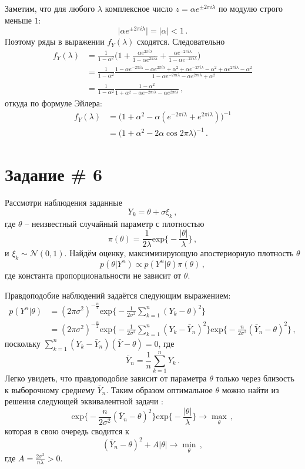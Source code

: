 \documentclass[a4paper]{article}
\begin{document}
Заметим, что для любого $\lambda$ комплексное число $z = \alpha e^{\pm 2\pi i \lambda}$
по модулю строго меньше $1$:
\[ \bigl\lvert \alpha e^{\pm 2\pi i \lambda}\bigr\rvert = |\alpha| < 1\,. \]
Поэтому ряды в выражении $f_Y(\lambda)$ сходятся. Следовательно
\begin{align*}
	f_Y(\lambda)
	&= \frac{1}{1-\alpha^2} \biggl( 1
		+ \frac{\alpha e^{2\pi i \lambda}}{1-\alpha e^{2\pi i \lambda}}
		+ \frac{\alpha e^{-2\pi i \lambda}}{1-\alpha e^{-2\pi i \lambda}}
		\biggr)\\
	&= \frac{1}{1-\alpha^2} \frac{
		1 - \alpha e^{-2\pi i \lambda} - \alpha e^{2\pi i \lambda } + \alpha^2
		+ \alpha e^{-2\pi i \lambda} - \alpha^2 + \alpha e^{2\pi i \lambda} - \alpha^2
	}{1 - \alpha e^{-2\pi i \lambda} - \alpha e^{2\pi i \lambda } + \alpha^2} \\
	&= \frac{1}{1-\alpha^2} \frac{ 1 - \alpha^2}{1 +
		\alpha^2 - \alpha e^{-2\pi i \lambda} - \alpha e^{2\pi i \lambda } } \,,
\end{align*}
откуда по формуле Эйлера:
\begin{align*}
	f_Y(\lambda)
	&= \biggl( 1 + \alpha^2 - \alpha ( e^{-2\pi i \lambda} + e^{2\pi i \lambda } ) \biggr)^{-1}\\
	&= \biggl( 1 + \alpha^2 - 2\alpha \cos 2\pi \lambda \biggr)^{-1} \,.
\end{align*}


\section{Задание \# 6} %
\label{sec:task_6}
Рассмотри наблюдения заданные
\[ Y_k  = \theta + \sigma \xi_k\,, \]
где $\theta$ -- неизвестный случайный параметр с плотностью
\[\pi(\theta) = \frac{1}{2\lambda} \text{exp}\bigl\{ -\frac{|\theta|}{\lambda} \bigr\} \,,\]
и $\xi_k\sim \mathcal{N}(0,1)$.
Найдём оценку, максимизирующую апостериорную плотность $\theta$
\[ p(\theta|Y^n) \propto p(Y^n|\theta) \pi(\theta) \,,\]
где константа пропорциональности не зависит от $\theta$.

Правдоподобие наблюдений задаётся следующим выражением:
\begin{align*}
	p(Y^n|\theta)
	&= (2\pi \sigma^2)^{-\frac{n}{2}} \text{exp}\bigl\{ - \frac{1}{2\sigma^2} \sum_{k=1}^n (Y_k - \theta)^2 \bigr\} \\
	&= (2\pi \sigma^2)^{-\frac{n}{2}}
		\text{exp}\bigl\{ - \frac{1}{2\sigma^2} \sum_{k=1}^n (Y_k - \bar{Y}_n)^2 \bigr\}
		\text{exp}\bigl\{ - \frac{n}{2\sigma^2}( \bar{Y}_n - \theta)^2 \bigr\} \,,
\end{align*}
поскольку $\sum_{k=1}^n (Y_k - \bar{Y}_n)(\bar{Y}-\theta) = 0$, где 
\[\bar{Y}_n = \frac{1}{n} \sum_{k=1}^n Y_k \,.\]
Легко увидеть, что правдоподобие зависит от параметра $\theta$ только через близость
к выборочному среднему $\bar{Y}_n$. Таким образом оптимальное $\theta$ можно найти
из решения следующей эквивалентной задачи :
\[
\text{exp}\bigl\{ - \frac{n}{2\sigma^2}( \bar{Y}_n - \theta)^2 \bigr\}
\text{exp}\bigl\{ - \frac{|\theta|}{\lambda} \bigr\} \to \max_\theta \,,
\]
которая в свою очередь сводится к
\[
(\bar{Y}_n - \theta)^2 + A |\theta| \to \min_\theta \,,
\]
где $A = \frac{2\sigma^2}{n\lambda} > 0$.
\end{document}
